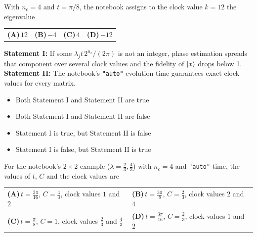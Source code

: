 \documentclass[11pt,a4paper]{article}
\newcommand{\optlabel}[1]{\textbf{(#1)}}
\newenvironment{qitem}[1]{\begin{list}{}{\setlength{\leftmargin}{3.3em}\setlength{\labelwidth}{3.1em}%
  \setlength{\labelsep}{0.2em}\setlength{\topsep}{3pt}\setlength{\parsep}{3pt}}\item[\textbf{Q.#1}\hfill]}{\end{list}}
\newcommand{\qsep}{\par\vspace{2pt}{\color{black!15}\hrule}\vspace{4pt}}
\begin{document}
\begin{qitem}{51}
With $n_c = 4$ and $t = \pi/8$, the notebook assigns to the clock value $k = 12$ the eigenvalue
\par\smallskip\noindent\begin{tabularx}{\linewidth}{@{}*{4}{L}@{}}
\optlabel{A}\,$12$ & \optlabel{B}\,$-4$ & \optlabel{C}\,$4$ & \optlabel{D}\,$-12$
\end{tabularx}
\end{qitem}
\qsep

\begin{qitem}{52}
\textbf{Statement I:} If some $\lambda_jt\,2^{n_c}/(2\pi)$ is not an integer, phase estimation spreads that component over several clock values and the fidelity of $\ket x$ drops below 1.\\[1mm]
\textbf{Statement II:} The notebook's \texttt{"auto"} evolution time guarantees exact clock values for every matrix.
\begin{itemize}[leftmargin=2.6em, labelsep=0.4em, itemsep=2pt, topsep=3pt]
\item[\optlabel{A}] Both Statement I and Statement II are true
\item[\optlabel{B}] Both Statement I and Statement II are false
\item[\optlabel{C}] Statement I is true, but Statement II is false
\item[\optlabel{D}] Statement I is false, but Statement II is true
\end{itemize}
\end{qitem}
\qsep

\begin{qitem}{53}
For the notebook's $2\times2$ example ($\lambda = \tfrac23, \tfrac43$) with $n_c = 4$ and \texttt{"auto"} time, the values of $t$, $C$ and the clock values are
\par\smallskip\noindent\begin{tabularx}{\linewidth}{@{}*{2}{L}@{}}
\optlabel{A}\,$t = \tfrac{3\pi}{16}$, $C = \tfrac43$, clock values $1$ and $2$ & \optlabel{B}\,$t = \tfrac{3\pi}{8}$, $C = \tfrac23$, clock values $2$ and $4$ \\[3pt]
\optlabel{C}\,$t = \tfrac\pi8$, $C = 1$, clock values $\tfrac23$ and $\tfrac43$ & \optlabel{D}\,$t = \tfrac{3\pi}{16}$, $C = \tfrac23$, clock values $1$ and $2$
\end{tabularx}
\end{qitem}
\qsep
\end{document}
